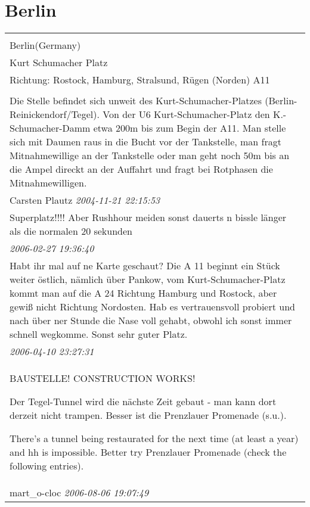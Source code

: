 \documentclass[a4paper,12pt]{article}
\begin{document}
\section{Berlin}
\begin{tabular}{|p{13cm}|}
\hline\\
Berlin(Germany)\\
Kurt Schumacher Platz\\
Richtung: Rostock, Hamburg, Stralsund, Rügen (Norden) A11 \\
\hline\\
Die Stelle befindet sich unweit des Kurt-Schumacher-Platzes (Berlin-Reinickendorf/Tegel). Von der U6 Kurt-Schumacher-Platz den K.-Schumacher-Damm etwa 200m bis zum Begin der A11. Man stelle sich mit Daumen raus in die Bucht vor der Tankstelle, man fragt Mitnahmewillige an der Tankstelle oder man geht noch 50m bis an die Ampel direckt an der Auffahrt und fragt bei Rotphasen die Mitnahmewilligen. \\
Carsten Plautz \textit{ 2004-11-21 22:15:53 }\\\hline Superplatz!!!! Aber Rushhour meiden sonst dauerts n bissle länger als die normalen 20 sekunden \\
\textit{ 2006-02-27 19:36:40 }\\\hline Habt ihr mal auf ne Karte geschaut? Die A 11 beginnt ein Stück weiter östlich, nämlich über Pankow, vom Kurt-Schumacher-Platz kommt man auf die A 24 Richtung Hamburg und Rostock, aber gewiß nicht Richtung Nordosten. Hab es vertrauensvoll probiert und nach über ner Stunde die Nase voll gehabt, obwohl ich sonst immer schnell wegkomme. Sonst sehr guter Platz. \\
\textit{ 2006-04-10 23:27:31 }\\\hline BAUSTELLE! CONSTRUCTION WORKS!

Der Tegel-Tunnel wird die nächste Zeit gebaut - man kann dort derzeit nicht trampen. Besser ist die Prenzlauer Promenade (s.u.).

There's a tunnel being restaurated for the next time (at least a year) and hh is impossible. Better try Prenzlauer Promenade (check the following entries). \\
mart\_o-cloc \textit{ 2006-08-06 19:07:49 }\\\hline
\end{tabular}
\end{document}
